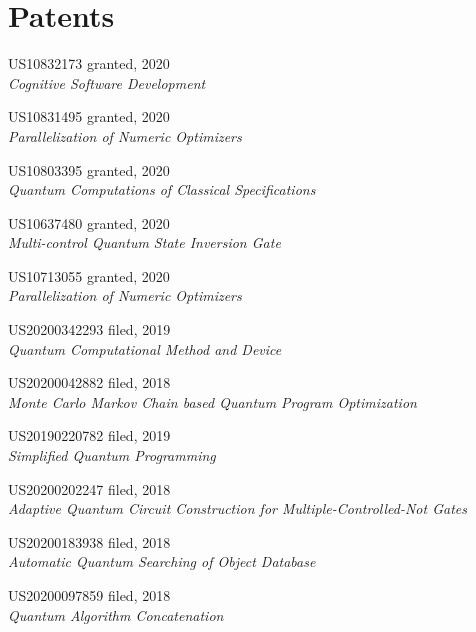 \section{\sc Patents}

{\sc US10832173} \hfill {\sc granted}, 2020\\
\emph{Cognitive Software Development}

{\sc US10831495} \hfill {\sc granted}, 2020\\
\emph{Parallelization of Numeric Optimizers}

{\sc US10803395} \hfill {\sc granted}, 2020\\
\emph{Quantum Computations of Classical Specifications}

{\sc US10637480} \hfill {\sc granted}, 2020\\
\emph{Multi-control Quantum State Inversion Gate}

{\sc US10713055} \hfill {\sc granted}, 2020\\
\emph{Parallelization of Numeric Optimizers}

{\sc US20200342293} \hfill {\sc filed}, 2019\\
\emph{Quantum Computational Method and Device}

{\sc US20200042882} \hfill {\sc filed}, 2018\\
\emph{Monte Carlo Markov Chain based Quantum Program Optimization}

{\sc US20190220782} \hfill {\sc filed}, 2019\\
\emph{Simplified Quantum Programming}

{\sc US20200202247} \hfill {\sc filed}, 2018\\
\emph{Adaptive Quantum Circuit Construction for Multiple-Controlled-Not Gates}

{\sc US20200183938} \hfill {\sc filed}, 2018\\
\emph{Automatic Quantum Searching of Object Database}

{\sc US20200097859} \hfill {\sc filed}, 2018\\
\emph{Quantum Algorithm Concatenation}

